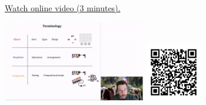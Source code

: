 
\begin{minipage}{10cm}
    \href{https://act4e-spring21.netlify.app/videos/spring2021-operads-a:terminology-operad.html}{Watch online video (3 minutes).}
        
    \href{https://act4e-spring21.netlify.app/videos/spring2021-operads-a:terminology-operad.html}{\includegraphics[height=3.5cm]{spring2021-operads-a:terminology-operad/thumbnails.jpg}}
    \href{https://act4e-spring21.netlify.app/videos/spring2021-operads-a:terminology-operad.html}{\includegraphics[height=2.5cm]{spring2021-operads-a:terminology-operad/qrcode.png}}
\end{minipage}
